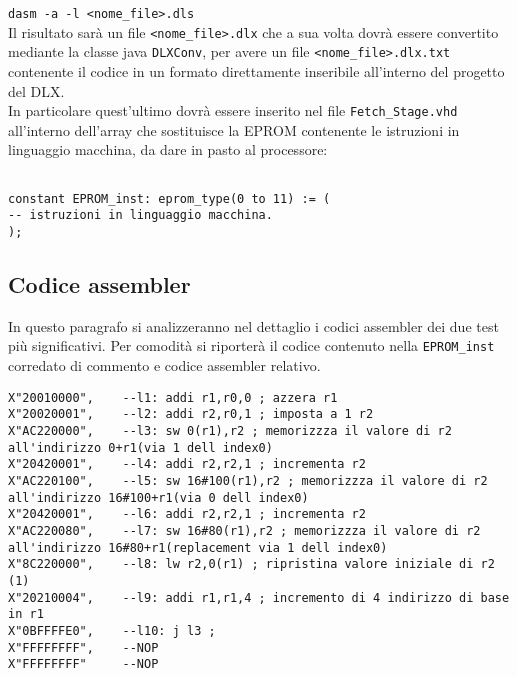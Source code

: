 \texttt{dasm -a -l <nome\_file>.dls}\\

Il risultato sar\`a un file \texttt{<nome\_file>.dlx} che a sua volta dovr\`a essere convertito mediante la classe java \texttt{DLXConv}, per avere un file  \texttt{<nome\_file>.dlx.txt} contenente il codice in un formato direttamente inseribile all'interno del progetto del DLX.\\

In particolare quest'ultimo dovr\`a essere inserito nel file \texttt{Fetch\_Stage.vhd} all'interno dell'array che sostituisce la EPROM contenente le istruzioni in linguaggio macchina, da dare in pasto al processore:\\

\lstset{language=VHDL, caption=Inserimento del codice nella memoria istruzioni, label=DescriptiveLabel, breaklines=true, basicstyle=\small, showspaces=false, showtabs=false, stringstyle=\ttfamily, showstringspaces=false,  tabsize=3} %

\begin{lstlisting}

constant EPROM_inst: eprom_type(0 to 11) := ( 
-- istruzioni in linguaggio macchina.
);

\end{lstlisting} 

\subsection{Codice assembler}
In questo paragrafo si analizzeranno nel dettaglio i codici assembler dei due test pi\`u significativi.
Per comodit\`a si riporter\`a il codice contenuto nella \texttt{EPROM\_inst} corredato di commento e codice assembler relativo.


\begin{lstlisting}
X"20010000",	--l1: addi r1,r0,0 ; azzera r1
X"20020001",	--l2: addi r2,r0,1 ; imposta a 1 r2
X"AC220000",	--l3: sw 0(r1),r2 ; memorizzza il valore di r2 all'indirizzo 0+r1(via 1 dell index0)
X"20420001",	--l4: addi r2,r2,1 ; incrementa r2
X"AC220100",	--l5: sw 16#100(r1),r2 ; memorizzza il valore di r2 all'indirizzo 16#100+r1(via 0 dell index0)
X"20420001",	--l6: addi r2,r2,1 ; incrementa r2
X"AC220080",	--l7: sw 16#80(r1),r2 ; memorizzza il valore di r2 all'indirizzo 16#80+r1(replacement via 1 dell index0) 
X"8C220000",	--l8: lw r2,0(r1) ; ripristina valore iniziale di r2 (1)
X"20210004",	--l9: addi r1,r1,4 ; incremento di 4 indirizzo di base in r1
X"0BFFFFE0",	--l10: j l3 ;
X"FFFFFFFF",	--NOP 
X"FFFFFFFF" 	--NOP

\end{lstlisting} 


